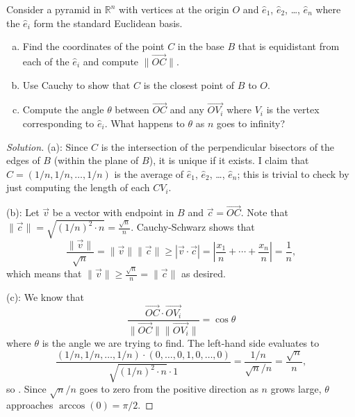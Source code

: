 \documentclass[11pt]{scrartcl}
\providecommand{\RR}{\mathbb R}
\providecommand{\ii}{\item}
\providecommand{\vect}[1]{\overrightarrow{#1}}
\newenvironment{soln}{\begin{proof}[Solution]}{\end{proof}}
\begin{document}
\begin{problem}
	Consider a pyramid in $\RR^n$ with vertices at the origin $O$
	and $\hat e_1$, $\hat e_2$, \dots, $\hat e_n$
	where the $\hat e_i$ form the standard Euclidean basis.
	\begin{enumerate}[(a)]
		\ii Find the coordinates of the point $C$ in the base $B$
		that is equidistant from each of the $\hat e_i$
		and compute $\|\vect{OC}\|$.
		\ii Use Cauchy to show that $C$ is the closest point of $B$ to $O$.
		\ii Compute the angle $\theta$ between $\vect{OC}$ and any $\vect{OV_i}$
		where $V_i$ is the vertex corresponding to $\hat e_i$.
		What happens to $\theta$ as $n$ goes to infinity?
	\end{enumerate}
\end{problem}

\begin{soln}
	(a): Since $C$ is the intersection of
	the perpendicular bisectors of the edges of $B$ (within the plane of $B$),
	it is unique if it exists. I claim that $C = (1/n, 1/n, \dots, 1/n)$
	is the average of $\hat e_1$, $\hat e_2$, \dots, $\hat e_n$;
	this is trivial to check by just computing the length of each $CV_i$.
	
	(b): Let $\vec v$ be a vector with endpoint in $B$ and $\vec c = \vect{OC}$.
	Note that $\|\vec c\| = \sqrt{(1/n)^2\cdot n} = \frac{\sqrt n}{n}$.
	Cauchy-Schwarz shows that
	\[\frac{\|\vec v\|}{\sqrt n} = \|\vec v\| \|\vec c\| \ge
	|\vec v\cdot\vec c| = \left|\frac{x_1}{n} + \cdots + \frac{x_n}{n}\right|
	= \frac 1n,\]
	which means that $\|\vec v\| \ge \frac{\sqrt n}n = \|\vec c\|$
	as desired.
	
	(c): We know that
	\[\frac{\vect{OC}\cdot\vect{OV_i}}{\|\vect{OC}\|\|\vect{OV_i}\|}
	= \cos\theta\]
	where $\theta$ is the angle we are trying to find.
	The left-hand side evaluates to
	\[\frac{(1/n, 1/n, \dots, 1/n)\cdot(0, \dots, 0, 1, 0, \dots, 0)}
	{\sqrt{(1/n)^2\cdot n}\cdot 1}
	= \frac{1/n}{\sqrt n/n} = \frac{\sqrt n}{n},\]
	so . Since $\sqrt n/n$
	goes to zero from the positive direction
	as $n$ grows large, $\theta$ approaches $\arccos(0) = \boxed{\pi/2}$.
\end{soln}
\end{document}

